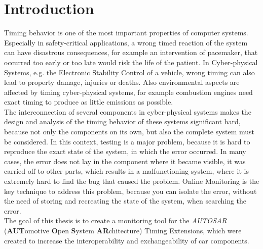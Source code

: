 
\chapter{Introduction}

Timing behavior is one of the most important properties of computer systems. Especially in safety-critical applications, a wrong timed reaction of the system can have disastrous consequences, for example an intervention of pacemaker, that occurred too early or too late would risk the life of the patient. In Cyber-physical Systems, e.g. the Electronic Stability Control of a vehicle, wrong timing can also lead to property damage, injuries or deaths. Also environmental aspects are affected by timing cyber-physical systems, for example combustion engines need exact timing to produce as little emissions as possible.\\
The interconnection of several components in cyber-physical systems makes the design and analysis of the timing behavior of these systems significant hard, because not only the components on its own, but also the complete system must be considered. In this context, testing is a major problem, because it is hard to reproduce the exact state of the system, in which the error occurred. In many cases, the error does not lay in the component where it became visible, it was carried off to other parts, which results in a malfunctioning system, where it is extremely hard to find the bug that caused the problem. Online Monitoring is the key technique to address this problem, because you can isolate the error, without the need of storing and recreating the state of the system, when searching the error.\\
The goal of this thesis is to create a monitoring tool for the \emph{AUTOSAR} (\textbf{AUT}omotive \textbf{O}pen \textbf{S}ystem \textbf{AR}chitecture) Timing Extensions, which were created to increase the interoperability and exchangeability of car components.

 
